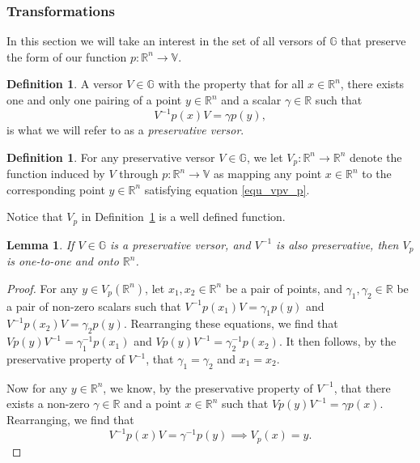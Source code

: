 \documentclass{birkjour}
\newtheorem{lem}[thm]{Lemma}
\theoremstyle{definition}
\newtheorem{defn}[thm]{Definition}
\theoremstyle{remark}
\numberwithin{equation}{section}
\newcommand{\R}{\mathbb{R}}
\newcommand{\G}{\mathbb{G}}
\newcommand{\V}{\mathbb{V}}
\begin{document}
\subsubsection{Transformations}

In this section we will take an interest in the set of all versors of $\G$ that preserve the form
of our function $p:\R^n\to\V$.
\begin{defn}
A versor $V\in\G$ with the property that for all $x\in\R^n$, there exists one and only one
pairing of a point $y\in\R^n$ and a scalar $\gamma\in\R$ such that
\begin{equation}\label{equ_vpv_p}
V^{-1}p(x)V = \gamma p(y),
\end{equation}
is what we will refer to as a {\it preservative versor}.
\end{defn}

\begin{defn}\label{def_preservative_versor}
For any preservative versor $V\in\G$, we let $V_p:\R^n\to\R^n$ denote
the function induced by $V$ through $p:\R^n\to\V$ as mapping any point $x\in\R^n$
to the corresponding point $y\in\R^n$ satisfying equation \eqref{equ_vpv_p}.
\end{defn}

Notice that $V_p$ in Definition~\ref{def_preservative_versor} is a well defined function.

\begin{lem}\label{lem_when_V_p_is_a_bijection}
If $V\in\G$ is a preservative versor, and $V^{-1}$ is also preservative, then
$V_p$ is one-to-one and onto $\R^n$.
\end{lem}
\begin{proof}
For any $y\in V_p(\R^n)$, let $x_1,x_2\in\R^n$ be a pair of points,
and $\gamma_1,\gamma_2\in\R$ be a pair of non-zero scalars
such that $V^{-1}p(x_1)V=\gamma_1p(y)$ and $V^{-1}p(x_2)V=\gamma_2p(y)$.
Rearranging these equations, we find that $Vp(y)V^{-1}=\gamma_1^{-1}p(x_1)$
and $Vp(y)V^{-1}=\gamma_2^{-1}p(x_2)$.  It then follows, by the
preservative property of $V^{-1}$, that
$\gamma_1=\gamma_2$ and $x_1=x_2$.

Now for any $y\in\R^n$, we know, by the preservative property of $V^{-1}$,
that there exists a non-zero $\gamma\in\R$ and a point $x\in\R^n$ such that
$Vp(y)V^{-1}=\gamma p(x)$.  Rearranging, we find that
\begin{equation}
V^{-1}p(x)V=\gamma^{-1}p(y)\implies V_p(x)=y.
\end{equation}
\end{proof}
\end{document}
